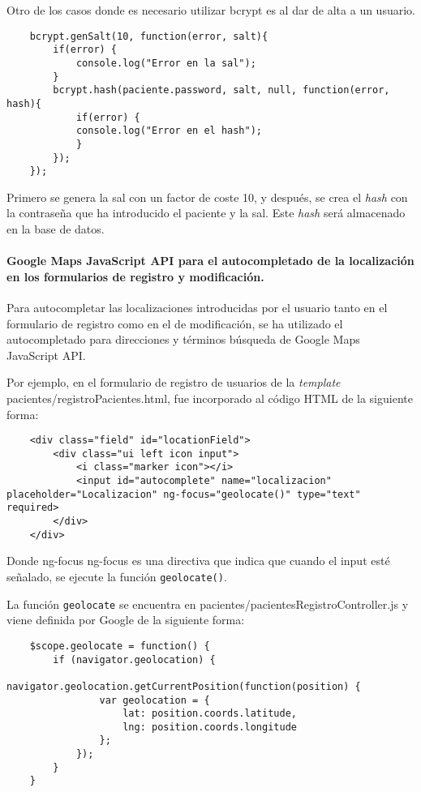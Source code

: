 Otro de los casos donde es necesario utilizar bcrypt es al dar de alta a un usuario.


\medskip
\begin{lstlisting}
	bcrypt.genSalt(10, function(error, salt){
		if(error) {
			console.log("Error en la sal");
		}
		bcrypt.hash(paciente.password, salt, null, function(error, hash){
			if(error) {
			console.log("Error en el hash");
			} 
		});
	});
\end{lstlisting}


Primero se genera la sal con un factor de coste 10, y después, se crea el \textit{hash} con la contraseña que ha introducido el paciente y la sal. Este \textit{hash} será almacenado en la base de datos.


\paragraph*{Google Maps JavaScript API para el autocompletado de la localización en los formularios de registro y modificación\cite{google_api}.}


Para autocompletar las localizaciones introducidas por el usuario tanto en el formulario de registro como en el de modificación, se ha utilizado el autocompletado para direcciones y términos búsqueda de Google Maps JavaScript API. 


Por ejemplo, en el formulario de registro de usuarios de la \textit{template} pacientes/registroPacientes.html, fue incorporado al código HTML de la siguiente forma:


\medskip
\begin{lstlisting}
	<div class="field" id="locationField">
		<div class="ui left icon input">
			<i class="marker icon"></i>
			<input id="autocomplete" name="localizacion" placeholder="Localizacion" ng-focus="geolocate()" type="text" required>
		</div>
	</div>
\end{lstlisting}


Donde ng-focus ng-focus es una directiva que indica que cuando el input esté señalado, se ejecute la función \texttt{geolocate()}.


La función \texttt{geolocate} se encuentra en pacientes/pacientesRegistroController.js y viene definida por Google de la siguiente forma:


\medskip
\begin{lstlisting}
	$scope.geolocate = function() {
		if (navigator.geolocation) {
			navigator.geolocation.getCurrentPosition(function(position) {
				var geolocation = {
					lat: position.coords.latitude,
					lng: position.coords.longitude
				};
			});
		}
	}
\end{lstlisting}


